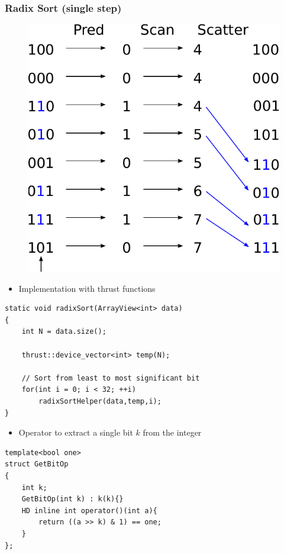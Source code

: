 \documentclass[aspectratio=169,handout]{beamer}
\begin{document}
\frame
{
	\frametitle{Radix Sort (single step)}
	\begin{figure}
		\centering
		\includegraphics[height=0.7\textheight]{radix6}
	\end{figure}
}

\begin{frame}[fragile]
\begin{itemize}
	\item Implementation with thrust functions
\end{itemize}
\begin{lstlisting}
static void radixSort(ArrayView<int> data)
{
	int N = data.size();
	
	thrust::device_vector<int> temp(N);

	// Sort from least to most significant bit
	for(int i = 0; i < 32; ++i)
		radixSortHelper(data,temp,i);
}

\end{lstlisting}
\end{frame}


\begin{frame}[fragile]
\begin{itemize}
	\item Operator to extract a single bit $k$ from the integer
\end{itemize}
\begin{lstlisting}
template<bool one>
struct GetBitOp
{
	int k;
	GetBitOp(int k) : k(k){}
	HD inline int operator()(int a){
		return ((a >> k) & 1) == one;
	}
};
\end{lstlisting}
\end{frame}
\end{document}

